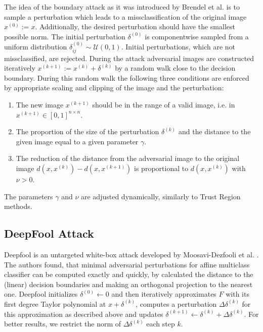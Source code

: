 \documentclass{article}
\begin{document}
The idea of the boundary attack as it was introduced by Brendel et al.  is to sample a perturbation which leads to a missclassification of the original image $x^{(0)}:=x$. Additionally, the desired perturbation should have the smallest possible norm. The initial perturbation $\delta^{(0)}$ is componentwise sampled from a uniform distribution $\delta^{(0)}_{ij}\sim \mathcal{U}(0,1)$. Initial perturbations, which are not missclassified, are rejected. During the attack adversarial images are constructed iteratively $x^{(k+1)}:= x^{(k)}+\delta^{(k)}$ by a random walk close to the decision boundary. During this random walk the following three conditions are enforced by appropriate scaling and clipping of the image and the perturbation:
\begin{enumerate}
	\item The new image $x^{(k+1)}$ should be in the range of a valid image, i.e. in $x^{(k+1)}\in [0,1]^{n\times n}$.
	\item The proportion of the size of the perturbation $\delta^{(k)}$ and the distance to the given image equal to a given parameter $\gamma$.
	\item The reduction of the distance from the adversarial image to the original image $d(x, x^{(k)})-d(x, x^{(k+1)})$ is proportional to $d(x, x^{(k)})$ with $\nu>0$.
\end{enumerate}
The parameters $\gamma$ and $\nu$ are adjusted dynamically, similarly to Trust Region methods.


\subsection{DeepFool Attack}
Deepfool is an untargeted white-box attack developed by Moosavi-Dezfooli et al. .
The authors found, that minimal adversarial perturbations for affine multiclass classifier can be computed exactly and quickly,
by calculated the distance to the (linear) decision boundaries and making an orthogonal projection to the nearest one.
Deepfool initializes $\delta^{(0)} \gets 0$ and then iteratively approximates $F$ with its first degree Taylor polynomial at $x + \delta^{(k)}$, computes a perturbation $\Delta \delta^{(k)}$ for this approximation as described above and updates $\delta^{(k+1)} \gets \delta^{(k)} + \Delta \delta^{(k)} $.
For better results, we restrict the norm of $\Delta \delta^{(k)} $ each step $k$.
\end{document}
